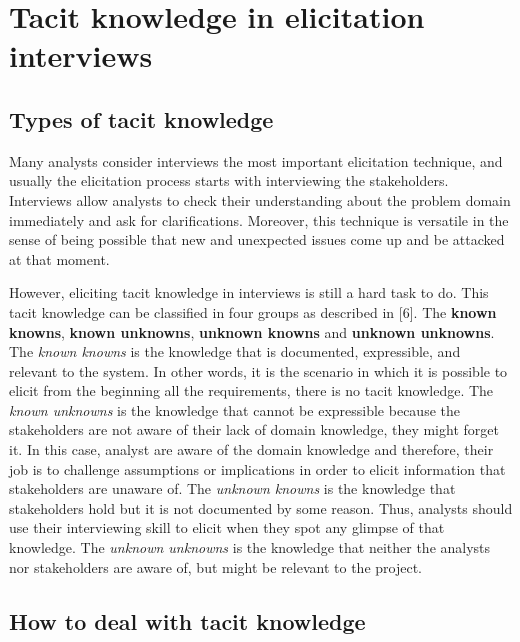 \documentclass[]{llncs}
\begin{document}
\hypertarget{tacit-knowledge-in-elicitation-interviews}{%
\section{Tacit knowledge in elicitation
interviews}\label{tacit-knowledge-in-elicitation-interviews}}

\hypertarget{types-of-tacit-knowledge}{%
\subsection{Types of tacit knowledge}\label{types-of-tacit-knowledge}}

Many analysts consider interviews the most important elicitation
technique, and usually the elicitation process starts with interviewing
the stakeholders. Interviews allow analysts to check their understanding
about the problem domain immediately and ask for clarifications.
Moreover, this technique is versatile in the sense of being possible
that new and unexpected issues come up and be attacked at that moment.

However, eliciting tacit knowledge in interviews is still a hard task to
do. This tacit knowledge can be classified in four groups as described
in {[}6{]}. The \textbf{known knowns}, \textbf{known unknowns},
\textbf{unknown knowns} and \textbf{unknown unknowns}. The \emph{known
knowns} is the knowledge that is documented, expressible, and relevant
to the system. In other words, it is the scenario in which it is
possible to elicit from the beginning all the requirements, there is no
tacit knowledge. The \emph{known unknowns} is the knowledge that cannot
be expressible because the stakeholders are not aware of their lack of
domain knowledge, they might forget it. In this case, analyst are aware
of the domain knowledge and therefore, their job is to challenge
assumptions or implications in order to elicit information that
stakeholders are unaware of. The \emph{unknown knowns} is the knowledge
that stakeholders hold but it is not documented by some reason. Thus,
analysts should use their interviewing skill to elicit when they spot
any glimpse of that knowledge. The \emph{unknown unknowns} is the
knowledge that neither the analysts nor stakeholders are aware of, but
might be relevant to the project.

\hypertarget{how-to-deal-with-tacit-knowledge}{%
\subsection{How to deal with tacit
knowledge}\label{how-to-deal-with-tacit-knowledge}}
\end{document}
